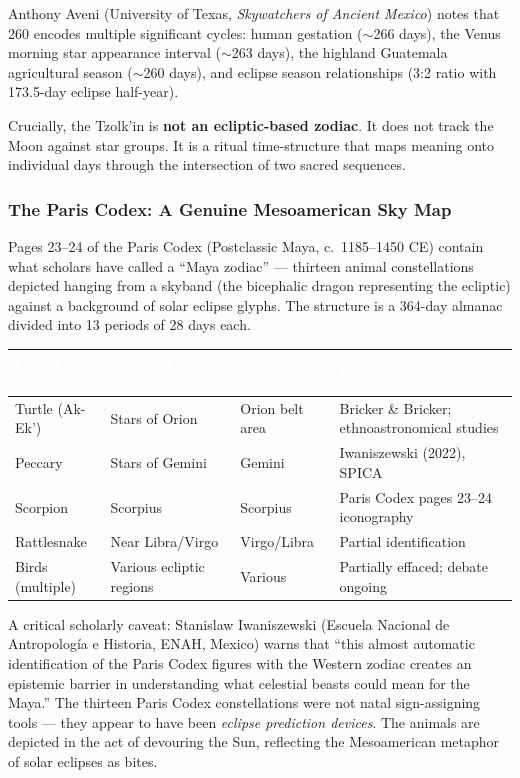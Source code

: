 \documentclass[11pt,letterpaper]{article}
\newcommand{\tableheader}[1]{\textbf{\sffamily\textcolor{white}{#1}}}
\begin{document}
Anthony Aveni (University of Texas, \textit{Skywatchers of Ancient Mexico}) notes that 260 encodes multiple significant cycles: human gestation ($\sim$266 days), the Venus morning star appearance interval ($\sim$263 days), the highland Guatemala agricultural season ($\sim$260 days), and eclipse season relationships (3:2 ratio with 173.5-day eclipse half-year).

Crucially, the Tzolk'in is \textbf{not an ecliptic-based zodiac}. It does not track the Moon against star groups. It is a ritual time-structure that maps meaning onto individual days through the intersection of two sacred sequences.

\subsubsection{The Paris Codex: A Genuine Mesoamerican Sky Map}

Pages 23--24 of the Paris Codex (Postclassic Maya, c.~1185--1450 CE) contain what scholars have called a ``Maya zodiac'' --- thirteen animal constellations depicted hanging from a skyband (the bicephalic dragon representing the ecliptic) against a background of solar eclipse glyphs. The structure is a 364-day almanac divided into 13 periods of 28 days each.

\begin{center}
\begin{tabularx}{\textwidth}{L{2.5cm}L{3cm}L{2.5cm}X}
\toprule
{}
\tableheader{Codex Animal} & \tableheader{Probable Identification} & \tableheader{Western Equiv.} & \tableheader{Scholarly Source} \\
\midrule
Turtle (Ak-Ek') & Stars of Orion & Orion belt area & Bricker \& Bricker; ethnoastronomical studies \\
Peccary & Stars of Gemini & Gemini & Iwaniszewski (2022), SPICA \\
Scorpion & Scorpius & Scorpius & Paris Codex pages 23--24 iconography \\
Rattlesnake & Near Libra/Virgo & Virgo/Libra & Partial identification \\
Birds (multiple) & Various ecliptic regions & Various & Partially effaced; debate ongoing \\
\bottomrule
\end{tabularx}
\end{center}

A critical scholarly caveat: Stanislaw Iwaniszewski (Escuela Nacional de Antropología e Historia, ENAH, Mexico) warns that ``this almost automatic identification of the Paris Codex figures with the Western zodiac creates an epistemic barrier in understanding what celestial beasts could mean for the Maya.'' The thirteen Paris Codex constellations were not natal sign-assigning tools --- they appear to have been \textit{eclipse prediction devices}. The animals are depicted in the act of devouring the Sun, reflecting the Mesoamerican metaphor of solar eclipses as bites.
\end{document}
